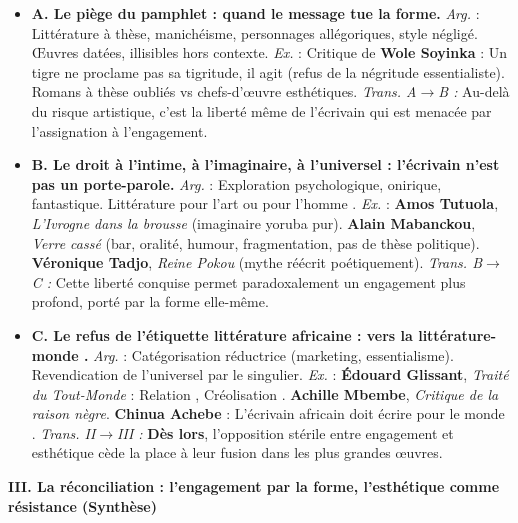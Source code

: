 \documentclass[11pt]{article}
\begin{document}
\begin{exoresolu}
\begin{itemize}
    \item \textbf{A. Le piège du pamphlet : quand le message tue la forme.}
    \textit{Arg.} : Littérature à thèse, manichéisme, personnages allégoriques, style négligé. Œuvres datées, illisibles hors contexte.
    \textit{Ex.} : Critique de \textbf{Wole Soyinka} : \og Un tigre ne proclame pas sa tigritude, il agit \fg (refus de la négritude essentialiste). Romans \og à thèse \fg oubliés vs chefs-d'œuvre esthétiques.
    \textit{Trans. A$\to$B :} \og Au-delà du risque artistique, c'est la liberté même de l'écrivain qui est menacée par l'assignation à l'engagement. \fg
    \item \textbf{B. Le droit à l'intime, à l'imaginaire, à l'universel : l'écrivain n'est pas un porte-parole.}
    \textit{Arg.} : Exploration psychologique, onirique, fantastique. Littérature \og pour l'art \fg ou \og pour l'homme \fg.
    \textit{Ex.} : \textbf{Amos Tutuola}, \emph{L'Ivrogne dans la brousse} (imaginaire yoruba pur). \textbf{Alain Mabanckou}, \emph{Verre cassé} (bar, oralité, humour, fragmentation, pas de thèse politique). \textbf{Véronique Tadjo}, \emph{Reine Pokou} (mythe réécrit poétiquement).
    \textit{Trans. B$\to$C :} \og Cette liberté conquise permet paradoxalement un engagement plus profond, porté par la forme elle-même. \fg
    \item \textbf{C. Le refus de l'étiquette \og littérature africaine \fg : vers la \og littérature-monde \fg.}
    \textit{Arg.} : Catégorisation réductrice (marketing, essentialisme). Revendication de l'universel par le singulier.
    \textit{Ex.} : \textbf{Édouard Glissant}, \emph{Traité du Tout-Monde} : \og Relation \fg, \og Créolisation \fg. \textbf{Achille Mbembe}, \emph{Critique de la raison nègre}. \textbf{Chinua Achebe} : \og L'écrivain africain doit écrire pour le monde \fg.
    \textit{Trans. II$\to$III :} \og \textbf{Dès lors}, l'opposition stérile entre engagement et esthétique cède la place à leur fusion dans les plus grandes œuvres. \fg
\end{itemize}

\textbf{III. La réconciliation : l'engagement par la forme, l'esthétique comme résistance (Synthèse)}


\end{exoresolu}
\end{document}
